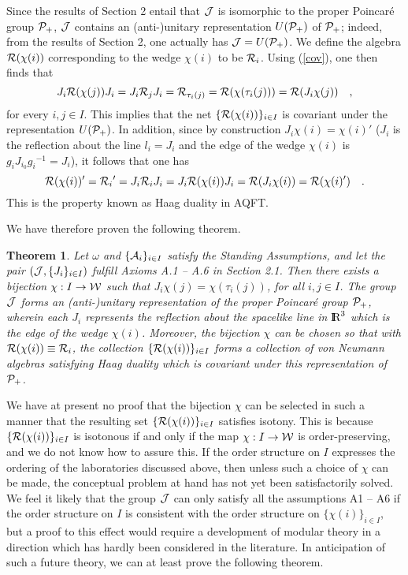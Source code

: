 \documentclass[a4paper,twoside,12pt]{article}
\newtheorem{theorem}{Theorem}[section]
\def\inet{{\{\As_i \}_{i \in I}}}
\def\As{{\cal A}}
\def\Js{{\cal J}}
\def\Ps{{\cal P}}
\def\Rs{{\cal R}}
\def\Ws{{\cal W}}
\def\RR{\textnormal{{\rm I \hskip -5.75pt R}}}
\begin{document}
     Since the results of Section 2 entail that $\Js$ is isomorphic to
the proper Poincar\'e group $\Ps_+$, $\Js$ contains an (anti-)unitary
representation $U(\Ps_+)$ of $\Ps_+$; indeed, from the results of
Section 2, one actually has $\Js = U(\Ps_+)$. We define the algebra
$\Rs(\chi(i))$ corresponding to the wedge $\chi(i)$ to be $\Rs_i$. 
Using (\ref{cov}), one then finds that
%
$$J_i \Rs(\chi(j)) J_i = J_i \Rs_j J_i = \Rs_{\tau_i(j)} = \Rs(\chi(\tau_i(j)))
= \Rs(J_i \chi(j)) \quad   ,  $$
%
for every $i,j \in I$. This implies that the net $\{ \Rs(\chi(i)) \}_{i \in I}$
is covariant under the representation $U(\Ps_+)$. In addition,
since by construction $J_i \chi(i) = \chi(i)'$ ($J_i$ is the reflection about
the line $l_i = J_i$ and the edge of the wedge $\chi(i)$ is 
$g_i J_{i_0} g_i{}^{-1} = J_i$), it follows that one has
%
$$\Rs(\chi(i))' = \Rs_i{}' = J_i \Rs_i J_i = J_i \Rs(\chi(i)) J_i = 
\Rs(J_i \chi(i)) = \Rs(\chi(i)') \quad .         $$
%
This is the property known as Haag duality in AQFT.

     We have therefore proven the following theorem.

\begin{theorem} \label{mainqft} Let $\omega$ and $\inet$ satisfy the
Standing Assumptions, and let the pair $(\Js,\{ J_i \}_{i \in I})$
fulfill Axioms A.1 -- A.6 in Section 2.1. Then there exists a
bijection $\chi : I \rightarrow \Ws$ such that 
$J_i \chi(j) = \chi(\tau_i(j))$, for all $i,j \in I$. The group $\Js$ 
forms an (anti-)unitary representation of the proper Poincar\'e group $\Ps_+$, 
wherein each $J_i$ represents the reflection about the spacelike line in 
$\RR^3$ which is the edge of the wedge $\chi(i)$.  Moreover, the bijection
$\chi$ can be chosen so that with $\Rs(\chi(i)) \equiv \Rs_{i}$, the
collection $\{ \Rs(\chi(i)) \}_{i \in I}$ forms a collection of von
Neumann algebras satisfying Haag duality which is covariant under this
representation of $\Ps_+$. 
\end{theorem}

     We have at present no proof that the bijection $\chi$ can be 
selected in such a manner that the resulting set
$\{ \Rs(\chi(i)) \}_{i \in I}$ satisfies isotony. This is because
$\{ \Rs(\chi(i)) \}_{i \in I}$ is isotonous if and only if
the map $\chi : I \rightarrow \Ws$ is order-preserving, and we
do not know how to assure this. If the order structure on $I$ expresses
the ordering of the laboratories discussed above, then unless such a 
choice of $\chi$ can be made, the conceptual problem at hand has not yet been
satisfactorily solved. We feel it likely that the 
group $\Js$ can only satisfy all the assumptions A1 -- A6 if the
order structure on $I$ is consistent with the order structure
on $\{ \chi(i) \}_{i \in I}$, but a proof to this effect would
require a development of modular theory in a direction which has
hardly been considered in the literature. In anticipation of such 
a future theory, we can at least prove the following theorem.
\end{document}

